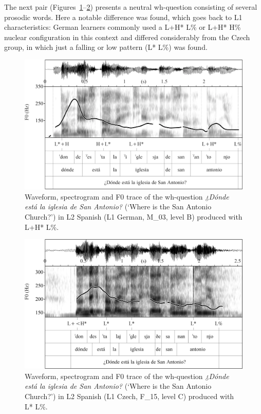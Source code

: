 The next pair (Figures~\ref{fig:4.117}--\ref{fig:4.118}) presents a neutral wh-question consisting of several prosodic words. Here a notable difference was found, which goes back to L1 characteristics: German learners commonly used a L+H* L\% or L+H* H\% nuclear configuration in this context and differed considerably from the Czech group, in which just a falling or low pattern (L* L\%) was found.

\begin{figure}


\includegraphics[width=\textwidth]{figures/Figure_4.117.png}



\caption{Waveform, spectrogram and F0 trace of the wh-question \textit{¿Dónde está la iglesia de San Antonio?} (‘Where is the San Antonio Church?’) in L2 Spanish (L1 German, M\_03, level B) produced with L+H* L\%.}
\label{fig:4.117}
\end{figure}

\begin{figure}


\includegraphics[width=\textwidth]{figures/Figure_4.118.png}



\caption{Waveform, spectrogram and F0 trace of the wh-question \textit{¿Dónde está la iglesia de San Antonio?} (‘Where is the San Antonio Church?’) in L2 Spanish (L1 Czech, F\_15, level C) produced with L* L\%.}
\label{fig:4.118}
\end{figure}

